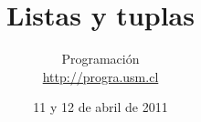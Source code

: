 \documentclass[12pt]{beamer}
\title{Listas y tuplas}
\author{
  Programación \\ \url{http://progra.usm.cl}
}
\date{11 y 12 de abril de 2011}
\begin{document}
  \begin{frame}
    \maketitle
  \end{frame}
\end{document}
